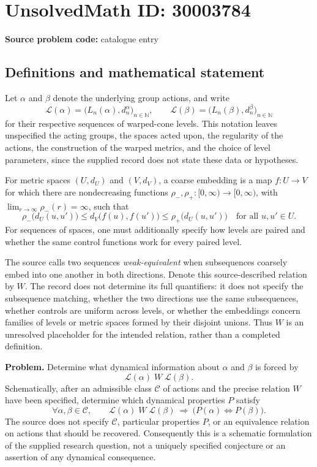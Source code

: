 \documentclass[11pt]{article}
\newcommand{\N}{\mathbb{N}}
\begin{document}
\section*{UnsolvedMath ID: 30003784}
\textbf{Source problem code:} catalogue entry
\subsection{Definitions and mathematical statement}
Let \(\alpha\) and \(\beta\) denote the underlying group actions, and write
\[
\mathcal L(\alpha)=\bigl(L_n(\alpha),d_n^\alpha\bigr)_{n\in\N},\qquad
\mathcal L(\beta)=\bigl(L_n(\beta),d_n^\beta\bigr)_{n\in\N}
\]
for their respective sequences of warped-cone levels. This notation leaves unspecified the acting groups, the spaces acted upon, the regularity of the actions, the construction of the warped metrics, and the choice of level parameters, since the supplied record does not state these data or hypotheses.

For metric spaces \((U,d_U)\) and \((V,d_V)\), a coarse embedding is a map \(f:U\to V\) for which there are nondecreasing functions \(\rho_-,\rho_+:[0,\infty)\to[0,\infty)\), with \(\lim_{r\to\infty}\rho_-(r)=\infty\), such that
\[
\rho_-\bigl(d_U(u,u')\bigr)
\le d_V\bigl(f(u),f(u')\bigr)
\le \rho_+\bigl(d_U(u,u')\bigr)
\quad\text{for all }u,u'\in U.
\]
For sequences of spaces, one must additionally specify how levels are paired and whether the same control functions work for every paired level.

The source calls two sequences \emph{weak-equivalent} when subsequences coarsely embed into one another in both directions. Denote this source-described relation by \(W\). The record does not determine its full quantifiers: it does not specify the subsequence matching, whether the two directions use the same subsequences, whether controls are uniform across levels, or whether the embeddings concern families of levels or metric spaces formed by their disjoint unions. Thus \(W\) is an unresolved placeholder for the intended relation, rather than a completed definition.

\textbf{Problem.} Determine what dynamical information about \(\alpha\) and \(\beta\) is forced by
\[
\mathcal L(\alpha)\;W\;\mathcal L(\beta).
\]
Schematically, after an admissible class \(\mathscr C\) of actions and the precise relation \(W\) have been specified, determine which dynamical properties \(P\) satisfy
\[
\forall\alpha,\beta\in\mathscr C,\qquad
\mathcal L(\alpha)\;W\;\mathcal L(\beta)
\ \Longrightarrow\ 
\bigl(P(\alpha)\Longleftrightarrow P(\beta)\bigr).
\]
The source does not specify \(\mathscr C\), particular properties \(P\), or an equivalence relation on actions that should be recovered. Consequently this is a schematic formulation of the supplied research question, not a uniquely specified conjecture or an assertion of any dynamical consequence.
\end{document}
